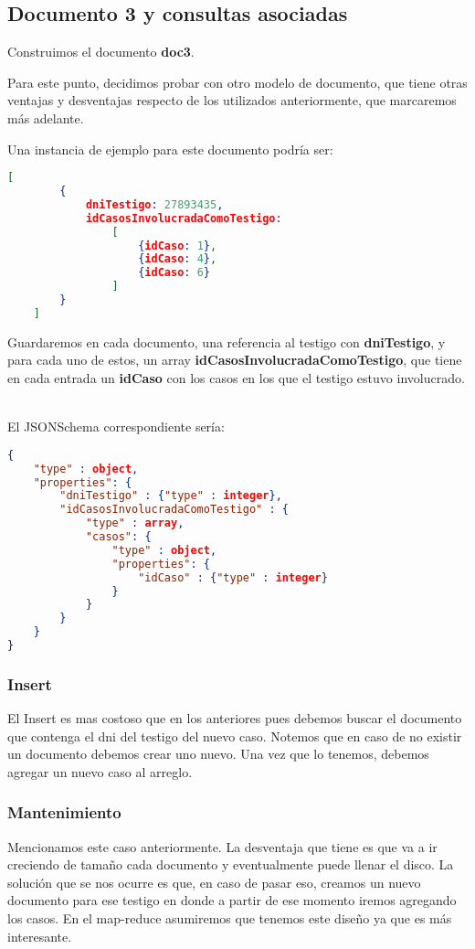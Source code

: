 \documentclass[11pt, a4paper]{article}
\begin{document}

\subsection{Documento 3 y consultas asociadas}

Construimos el documento \textbf{doc3}.

Para este punto, decidimos probar con otro modelo de documento, que tiene otras ventajas y desventajas respecto de los utilizados anteriormente, que marcaremos más adelante.

Una instancia de ejemplo para este documento podría ser:

\begin{lstlisting}[language=json]
	[
		{
			dniTestigo: 27893435,
			idCasosInvolucradaComoTestigo:
				[
					{idCaso: 1},
					{idCaso: 4},
					{idCaso: 6}
				]
		}
	]
\end{lstlisting}

Guardaremos en cada documento,  una referencia al testigo con \textbf{dniTestigo}, y para cada uno de estos, un array \textbf{idCasosInvolucradaComoTestigo}, que tiene en cada entrada un \textbf{idCaso} con los casos en los que el testigo estuvo involucrado. \

El JSONSchema correspondiente sería:
\begin{lstlisting}[language=json]
{
	"type" : object,
	"properties": {
		"dniTestigo" : {"type" : integer},
		"idCasosInvolucradaComoTestigo" : {
			"type" : array,
			"casos": {
				"type" : object,
				"properties": {
					"idCaso" : {"type" : integer}
				}
			}
		}
	}
}
\end{lstlisting}

\subsubsection{Insert}

El Insert es mas costoso que en los anteriores pues debemos buscar el documento que contenga el dni del testigo del nuevo caso. Notemos que en caso de no existir un documento debemos crear uno nuevo. Una vez que lo tenemos, debemos agregar un nuevo caso al arreglo.

\subsubsection{Mantenimiento}

Mencionamos este caso anteriormente. La desventaja que tiene es que va a ir creciendo de tama\~no cada documento y eventualmente puede llenar el disco. La soluci\'on que se nos ocurre es que, en caso de pasar eso, creamos un nuevo documento para ese testigo en donde a partir de ese momento iremos agregando los casos. En el map-reduce asumiremos que tenemos este dise\~no ya que es m\'as interesante.
\end{document}
